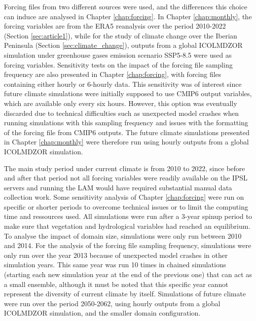 Forcing files from two different sources were used, and the differences this choice can induce are analysed in Chapter \ref{chap:forcing}. In Chapter \ref{chap:monthly}, the forcing variables are from the ERA5 reanalysis over the period 2010-2022 (Section \ref{sec:article1}), while for the study of climate change over the Iberian Peninsula (Section \ref{sec:climate_change}), outputs from a global ICOLMDZOR simulation under greenhouse gases emission scenario SSP5-8.5 were used as forcing variables.
Sensitivity tests on the impact of the forcing file sampling frequency are also presented in Chapter \ref{chap:forcing}, with forcing files containing either hourly or 6-hourly data.
This sensitivity was of interest since future climate simulations were initially supposed to use CMIP6 output variables, which are available only every six hours. However, this option was eventually discarded due to technical difficulties such as unexpected model crashes when running simulations with this sampling frequency and issues with the formatting of the forcing file from CMIP6 outputs. The future climate simulations presented in Chapter \ref{chap:monthly} were therefore run using hourly outputs from a global ICOLMDZOR simulation.


The main study period under current climate is from 2010 to 2022, since before and after that period not all forcing variables were readily available on the IPSL servers and running the LAM would have required substantial manual data collection work. Some sensitivity analysis of Chapter \ref{chap:forcing} were run on specific or shorter periods to overcome technical issues or to limit the computing time and ressources used.
All simulations were run after a 3-year spinup period to make sure that vegetation and hydrological variables had reached an equilibrium. 
To analyse the impact of domain size, simulations were only run between 2010 and 2014. 
For the analysis of the forcing file sampling frequency, simulations were only run over the year 2013 because of unexpected model crashes in other simulation years. This same year was run 10 times in chained simulations (starting each new simulation year at the end of the previous one) that can act as a small ensemble, although it must be noted that this specific year cannot represent the diversity of current climate by itself.
Simulations of future climate were run over the period 2050-2062, using hourly outputs from a global ICOLMDZOR simulation, and the smaller domain configuration. 

